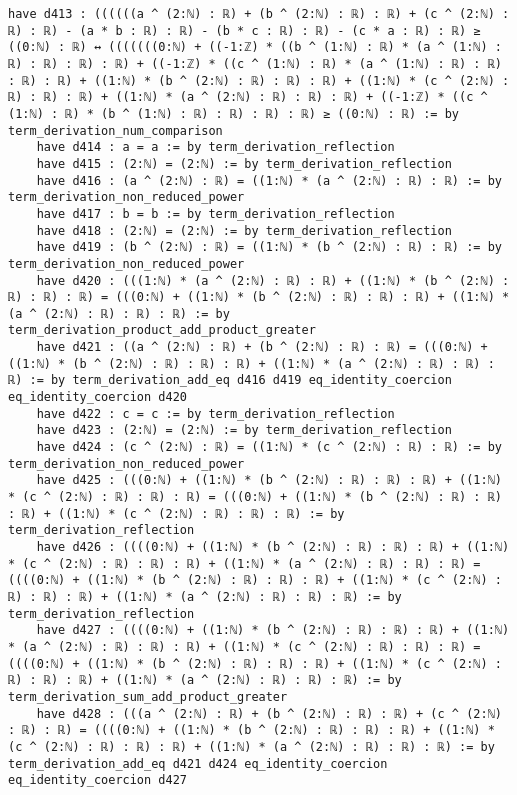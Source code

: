 \documentclass{article}
\begin{document}
\begin{tcolorbox}[colback=white!10, width=\linewidth]
\begin{lstlisting}[language=Lean4]
    have d413 : ((((((a ^ (2:ℕ) : ℝ) + (b ^ (2:ℕ) : ℝ) : ℝ) + (c ^ (2:ℕ) : ℝ) : ℝ) - (a * b : ℝ) : ℝ) - (b * c : ℝ) : ℝ) - (c * a : ℝ) : ℝ) ≥ ((0:ℕ) : ℝ) ↔ (((((((0:ℕ) + ((-1:ℤ) * ((b ^ (1:ℕ) : ℝ) * (a ^ (1:ℕ) : ℝ) : ℝ) : ℝ) : ℝ) + ((-1:ℤ) * ((c ^ (1:ℕ) : ℝ) * (a ^ (1:ℕ) : ℝ) : ℝ) : ℝ) : ℝ) + ((1:ℕ) * (b ^ (2:ℕ) : ℝ) : ℝ) : ℝ) + ((1:ℕ) * (c ^ (2:ℕ) : ℝ) : ℝ) : ℝ) + ((1:ℕ) * (a ^ (2:ℕ) : ℝ) : ℝ) : ℝ) + ((-1:ℤ) * ((c ^ (1:ℕ) : ℝ) * (b ^ (1:ℕ) : ℝ) : ℝ) : ℝ) : ℝ) ≥ ((0:ℕ) : ℝ) := by term_derivation_num_comparison
    have d414 : a = a := by term_derivation_reflection
    have d415 : (2:ℕ) = (2:ℕ) := by term_derivation_reflection
    have d416 : (a ^ (2:ℕ) : ℝ) = ((1:ℕ) * (a ^ (2:ℕ) : ℝ) : ℝ) := by term_derivation_non_reduced_power
    have d417 : b = b := by term_derivation_reflection
    have d418 : (2:ℕ) = (2:ℕ) := by term_derivation_reflection
    have d419 : (b ^ (2:ℕ) : ℝ) = ((1:ℕ) * (b ^ (2:ℕ) : ℝ) : ℝ) := by term_derivation_non_reduced_power
    have d420 : (((1:ℕ) * (a ^ (2:ℕ) : ℝ) : ℝ) + ((1:ℕ) * (b ^ (2:ℕ) : ℝ) : ℝ) : ℝ) = (((0:ℕ) + ((1:ℕ) * (b ^ (2:ℕ) : ℝ) : ℝ) : ℝ) + ((1:ℕ) * (a ^ (2:ℕ) : ℝ) : ℝ) : ℝ) := by term_derivation_product_add_product_greater
    have d421 : ((a ^ (2:ℕ) : ℝ) + (b ^ (2:ℕ) : ℝ) : ℝ) = (((0:ℕ) + ((1:ℕ) * (b ^ (2:ℕ) : ℝ) : ℝ) : ℝ) + ((1:ℕ) * (a ^ (2:ℕ) : ℝ) : ℝ) : ℝ) := by term_derivation_add_eq d416 d419 eq_identity_coercion eq_identity_coercion d420
    have d422 : c = c := by term_derivation_reflection
    have d423 : (2:ℕ) = (2:ℕ) := by term_derivation_reflection
    have d424 : (c ^ (2:ℕ) : ℝ) = ((1:ℕ) * (c ^ (2:ℕ) : ℝ) : ℝ) := by term_derivation_non_reduced_power
    have d425 : (((0:ℕ) + ((1:ℕ) * (b ^ (2:ℕ) : ℝ) : ℝ) : ℝ) + ((1:ℕ) * (c ^ (2:ℕ) : ℝ) : ℝ) : ℝ) = (((0:ℕ) + ((1:ℕ) * (b ^ (2:ℕ) : ℝ) : ℝ) : ℝ) + ((1:ℕ) * (c ^ (2:ℕ) : ℝ) : ℝ) : ℝ) := by term_derivation_reflection
    have d426 : ((((0:ℕ) + ((1:ℕ) * (b ^ (2:ℕ) : ℝ) : ℝ) : ℝ) + ((1:ℕ) * (c ^ (2:ℕ) : ℝ) : ℝ) : ℝ) + ((1:ℕ) * (a ^ (2:ℕ) : ℝ) : ℝ) : ℝ) = ((((0:ℕ) + ((1:ℕ) * (b ^ (2:ℕ) : ℝ) : ℝ) : ℝ) + ((1:ℕ) * (c ^ (2:ℕ) : ℝ) : ℝ) : ℝ) + ((1:ℕ) * (a ^ (2:ℕ) : ℝ) : ℝ) : ℝ) := by term_derivation_reflection
    have d427 : ((((0:ℕ) + ((1:ℕ) * (b ^ (2:ℕ) : ℝ) : ℝ) : ℝ) + ((1:ℕ) * (a ^ (2:ℕ) : ℝ) : ℝ) : ℝ) + ((1:ℕ) * (c ^ (2:ℕ) : ℝ) : ℝ) : ℝ) = ((((0:ℕ) + ((1:ℕ) * (b ^ (2:ℕ) : ℝ) : ℝ) : ℝ) + ((1:ℕ) * (c ^ (2:ℕ) : ℝ) : ℝ) : ℝ) + ((1:ℕ) * (a ^ (2:ℕ) : ℝ) : ℝ) : ℝ) := by term_derivation_sum_add_product_greater
    have d428 : (((a ^ (2:ℕ) : ℝ) + (b ^ (2:ℕ) : ℝ) : ℝ) + (c ^ (2:ℕ) : ℝ) : ℝ) = ((((0:ℕ) + ((1:ℕ) * (b ^ (2:ℕ) : ℝ) : ℝ) : ℝ) + ((1:ℕ) * (c ^ (2:ℕ) : ℝ) : ℝ) : ℝ) + ((1:ℕ) * (a ^ (2:ℕ) : ℝ) : ℝ) : ℝ) := by term_derivation_add_eq d421 d424 eq_identity_coercion eq_identity_coercion d427

\end{lstlisting}
\end{tcolorbox}
\end{document}
